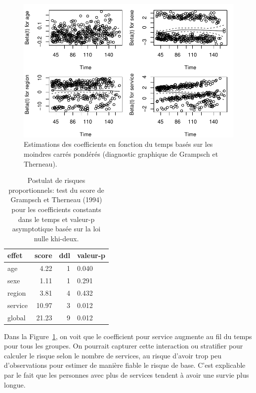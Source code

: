 \documentclass[
  11pt,
  letterpaper,
]{scrbook}
\theoremstyle{definition}
\theoremstyle{remark}
\begin{document}
\begin{figure}[ht!]

{\centering \includegraphics{survie_files/figure-pdf/fig-coxphhypothese-1.pdf}

}

\caption{\label{fig-coxphhypothese}Estimations des coefficients en
fonction du temps basés sur les moindres carrés pondérés (diagnostic
graphique de Grampsch et Therneau).}

\end{figure}

\hypertarget{tbl-coxphhypothese}{}
\begin{table}
\caption{\label{tbl-coxphhypothese}Postulat de risques proportionnels: test du score de Grampsch et
Therneau (1994) pour les coefficients constants dans le temps et
valeur-p asymptotique basée sur la loi nulle khi-deux. }\tabularnewline

\centering
\begin{tabular}{lrrl}
\toprule
effet & score & ddl & valeur-p\\
\midrule
age & 4.22 & 1 & 0.040\\
sexe & 1.11 & 1 & 0.291\\
region & 3.81 & 4 & 0.432\\
service & 10.97 & 3 & 0.012\\
global & 21.23 & 9 & 0.012\\
\bottomrule
\end{tabular}
\end{table}

Dans la Figure~\ref{fig-coxphhypothese}, on voit que le coefficient pour
service augmente au fil du temps pour tous les groupes. On pourrait
capturer cette interaction ou stratifier pour calculer le risque selon
le nombre de services, au risque d'avoir trop peu d'observations pour
estimer de manière fiable le risque de base. C'est explicable par le
fait que les personnes avec plus de services tendent à avoir une survie
plus longue.
\end{document}
